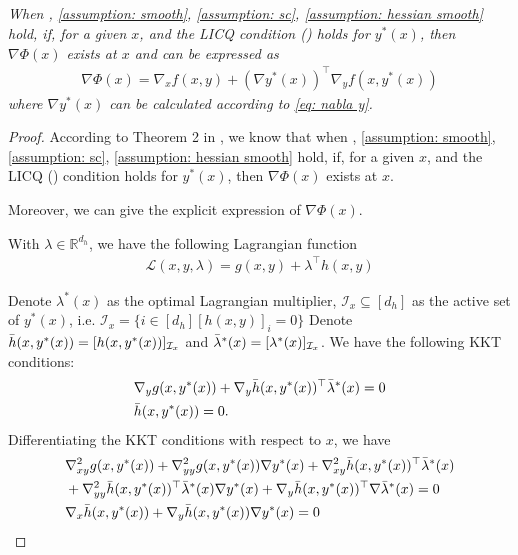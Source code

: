 \documentclass{article}
\newcommand{\Ic}{\mathcal{I}}
\newcommand{\Lc}{\mathcal{L}}
\def\R{\mathbb{R}}
\theoremstyle{plain}
\theoremstyle{definition}
\theoremstyle{remark}
\begin{document}
\subsection*{}
\emph{When , \ref{assumption: smooth}, \ref{assumption: sc}, \ref{assumption: hessian smooth} hold, if, for a given $x$,  and the LICQ condition () holds for $y^*(x)$, then $\nabla \Phi(x)$ exists at $x$ and can be expressed as
\begin{align*}
    \nabla \Phi(x)=\nabla_x f(x,y)+(\nabla y^*(x))^\top \nabla_y f(x,y^*(x))
\end{align*}
where $\nabla y^*(x)$ can be calculated according to \eqref{eq: nabla y}.
}



\begin{proof}
According to Theorem 2 in \cite{xu2023efficient}, we know that when , \ref{assumption: smooth}, \ref{assumption: sc}, \ref{assumption: hessian smooth} hold, if, for a given $x$,  and  the LICQ () condition holds for $y^*(x)$, then $\nabla \Phi(x)$ exists at $x$.

Moreover, we can give the explicit expression of $\nabla \Phi(x)$.

With $\lambda\in \R^{d_h}$, we have the following Lagrangian function
\begin{align*}
    \Lc(x,y, \lambda)=g(x,y) + \lambda^\top h(x,y)
\end{align*}

Denote $\lambda^*(x)$ as the optimal Lagrangian multiplier,  $\Ic_{x}\subseteq [d_h]$ as the active set of $y^*(x)$, i.e. $\Ic_{x}=\{i\in [d_h] [h(x,y)]_i=0\}$
Denote $\Bar{h}(x,y^*(x))=[h(x,y^*(x))]_{\Ic_{x}}$ and $\Bar{\lambda}^*(x)=[\lambda^*(x)]_{\Ic_{x}}$. We have the following KKT conditions:
\begin{align*}
    &\nabla_y g(x, y^*(x))+\nabla_y\Bar{h}(x,y^*(x))^\top \Bar{\lambda}^*(x)=0\\
    &\Bar{h}(x,y^*(x))=0.
\end{align*}
Differentiating the KKT conditions with respect to $x$, we have
\begin{align*}
    &\nabla^2_{xy} g(x, y^*(x))+  \nabla^2_{yy} g(x, y^*(x))\nabla y^*(x) +\nabla^2_{xy}\Bar{h}(x,y^*(x))^\top\Bar{\lambda}^*(x)\\
    &+\nabla^2_{yy}\Bar{h}(x,y^*(x))^\top\Bar{\lambda}^*(x)\nabla y^*(x)+ \nabla_y\Bar{h}(x,y^*(x))^\top \nabla\Bar{\lambda}^*(x)=0\\
    &\nabla_x\Bar{h}(x,y^*(x))+\nabla_y\Bar{h}(x,y^*(x))\nabla y^*(x)=0
\end{align*}


\end{proof}
\end{document}
